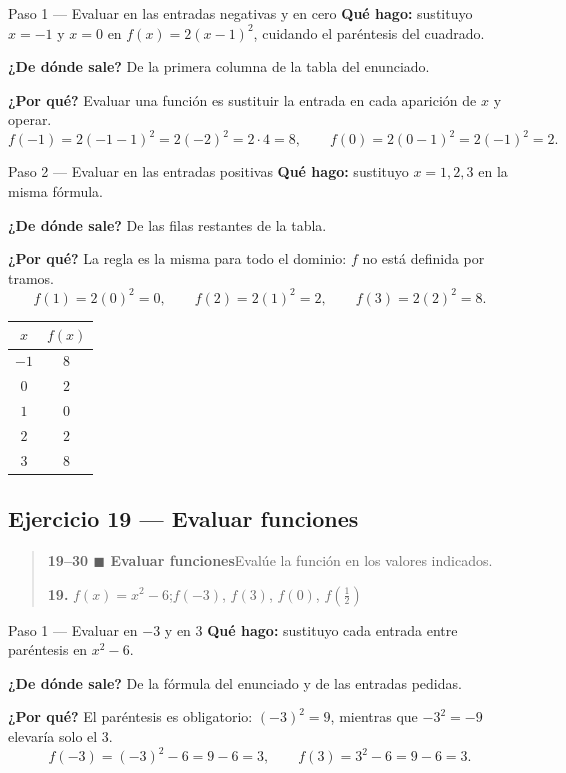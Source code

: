 \documentclass[11pt]{article}
\begin{document}
\begin{paso}{Paso 1 --- Evaluar en las entradas negativas y en cero}
\textbf{Qué hago:} sustituyo $x=-1$ y $x=0$ en $f(x)=2(x-1)^2$, cuidando el paréntesis del cuadrado.

\textbf{¿De dónde sale?} De la primera columna de la tabla del enunciado.

\textbf{¿Por qué?} Evaluar una función es sustituir la entrada en cada aparición de $x$ y operar.
\[
f(-1)=2(-1-1)^2=2(-2)^2=2\cdot 4=8,\qquad
f(0)=2(0-1)^2=2(-1)^2=2.
\]
\end{paso}

\begin{paso}{Paso 2 --- Evaluar en las entradas positivas}
\textbf{Qué hago:} sustituyo $x=1,2,3$ en la misma fórmula.

\textbf{¿De dónde sale?} De las filas restantes de la tabla.

\textbf{¿Por qué?} La regla es la misma para todo el dominio: $f$ no está definida por tramos.
\[
f(1)=2(0)^2=0,\qquad f(2)=2(1)^2=2,\qquad f(3)=2(2)^2=8.
\]
\end{paso}

\begin{resp}
\begin{center}
\begin{tabular}{|c|c|}
\hline
$x$ & $f(x)$ \\ \hline
$-1$ & $8$ \\
$0$ & $2$ \\
$1$ & $0$ \\
$2$ & $2$ \\
$3$ & $8$ \\ \hline
\end{tabular}
\end{center}
\end{resp}

\subsection*{Ejercicio 19 — Evaluar funciones}

\begin{quote}
\textbf{19--30 $\blacksquare$ Evaluar funciones}\quad Evalúe la función en los valores indicados.

\textbf{19.} $f(x)=x^2-6$;\quad $f(-3)$, $f(3)$, $f(0)$, $f\!\left(\tfrac12\right)$
\end{quote}

\begin{paso}{Paso 1 --- Evaluar en $-3$ y en $3$}
\textbf{Qué hago:} sustituyo cada entrada entre paréntesis en $x^2-6$.

\textbf{¿De dónde sale?} De la fórmula del enunciado y de las entradas pedidas.

\textbf{¿Por qué?} El paréntesis es obligatorio: $(-3)^2=9$, mientras que $-3^2=-9$ elevaría solo el 3.
\[
f(-3)=(-3)^2-6=9-6=3,\qquad f(3)=3^2-6=9-6=3.
\]
\end{paso}
\end{document}
